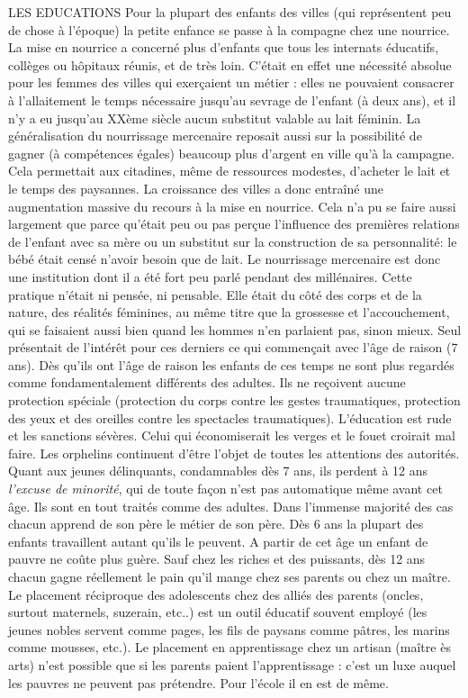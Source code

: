 LES EDUCATIONS
 Pour la plupart des enfants des villes (qui représentent peu de chose à l'époque) la petite enfance se passe à la compagne chez une nourrice. La mise en nourrice a concerné plus d'enfants que tous les internats éducatifs, collèges ou hôpitaux réunis, et de très loin. C'était en effet une nécessité absolue pour les femmes des villes qui exerçaient un métier : elles ne pouvaient consacrer à l'allaitement le temps nécessaire jusqu'au sevrage de l'enfant (à deux ans), et il n'y a eu jusqu'au XXème siècle aucun substitut valable au lait féminin. La généralisation du nourrissage mercenaire reposait aussi sur la possibilité de gagner (à compétences égales) beaucoup plus d'argent en ville qu'à la campagne. Cela permettait aux citadines, même de ressources modestes, d'acheter le lait et le temps des paysannes. La croissance des villes a donc entraîné une augmentation massive du recours à la mise en nourrice.
 Cela n'a pu se faire aussi largement que parce qu'était peu ou pas perçue l'influence des premières relations de l'enfant avec sa mère ou un substitut sur la construction de sa personnalité: le bébé était censé n'avoir besoin que de lait. Le nourrissage mercenaire est donc une institution dont il a été fort peu parlé pendant des millénaires. Cette pratique n'était ni pensée, ni pensable. Elle était du côté des corps et de la nature, des réalités féminines, au même titre que la grossesse et l'accouchement, qui se faisaient aussi bien quand les hommes n'en parlaient pas, sinon mieux. Seul présentait de l'intérêt pour ces derniers ce qui commençait avec l'âge de raison (7 ans).
 Dès qu'ils ont l'âge de raison les enfants de ces temps ne sont plus regardés comme fondamentalement différents des adultes. Ils ne reçoivent aucune protection spéciale (protection du corps contre les gestes traumatiques, protection des yeux et des oreilles contre les spectacles traumatiques). L'éducation est rude et les sanctions sévères. Celui qui économiserait les verges et le fouet croirait mal faire. Les orphelins continuent d'être l'objet de toutes les attentions des autorités. Quant aux jeunes délinquants, condamnables dès 7 ans, ils perdent à 12 ans \emph{l'excuse de minorité}, qui de toute façon n'est pas automatique même avant cet âge. Ils sont en tout traités comme des adultes.
 Dans l'immense majorité des cas chacun apprend de son père le métier de son père. Dès 6 ans la plupart des enfants travaillent autant qu'ils le peuvent. A partir de cet âge un enfant de pauvre ne coûte plus guère. Sauf chez les riches et des puissants, dès 12 ans chacun gagne réellement le pain qu'il mange chez ses parents ou chez un maître. Le placement réciproque des adolescents chez des alliés des parents (oncles, surtout maternels, suzerain, etc..) est un outil éducatif souvent employé (les jeunes nobles servent comme pages, les fils de paysans comme pâtres, les marins comme mousses, etc.). Le placement en apprentissage chez un artisan (maître ès arts) n'est possible que si les parents paient l'apprentissage : c'est un luxe auquel les pauvres ne peuvent pas prétendre. Pour l'école il en est de même. 
